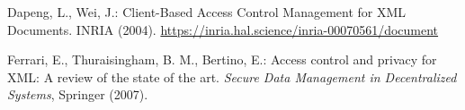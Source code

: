 \documentclass[runningheads]{llncs}
\begin{document}
\begin{spacing}{1.5}
\begin{thebibliography}{9}
    Dapeng, L., Wei, J.: Client-Based Access Control Management for XML Documents. INRIA (2004). \url{https://inria.hal.science/inria-00070561/document}
    
    Ferrari, E., Thuraisingham, B. M., Bertino, E.: Access control and privacy for XML: A review of the state of the art. \textit{Secure Data Management in Decentralized Systems}, Springer (2007). 
    
\end{thebibliography}
\end{spacing}
    
\end{document}
